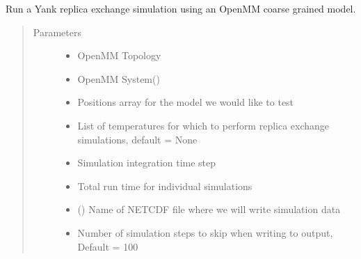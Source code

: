 \documentclass[letterpaper,12pt,english,openany,oneside]{sphinxmanual}
\begin{document}
\begin{fulllineitems}
\label{\detokenize{simulation:simulation.rep_exch.run_replica_exchange}}
Run a Yank replica exchange simulation using an OpenMM coarse grained model.
\begin{quote}\begin{description}
\item[{Parameters}] \leavevmode\begin{itemize}
\item {} 
 \textendash{} OpenMM Topology

\item {} 
 \textendash{} OpenMM System()

\item {} 
 \textendash{} Positions array for the model we would like to test

\item {} 
 \textendash{} List of temperatures for which to perform replica exchange simulations, default = None

\item {} 
 \textendash{} Simulation integration time step

\item {} 
 \textendash{} Total run time for individual simulations

\item {} 
 () \textendash{} Name of NETCDF file where we will write simulation data

\item {} 
 \textendash{} Number of simulation steps to skip when writing to output, Default = 100


\end{itemize}
\end{description}
\end{quote}
\end{fulllineitems}
\end{document}
